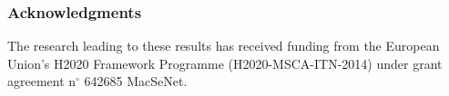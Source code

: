 \documentclass{article} %
\newcommand{\todo}[1]{{\color{red} #1 }}
\begin{document}

\subsubsection*{Acknowledgments}
The research leading to these results has received funding from the European Union's 
H2020 Framework Programme (H2020-MSCA-ITN-2014) under grant agreement n$^{\circ}$ 642685 MacSeNet.
{
	\small
	
	
}
\end{document}
